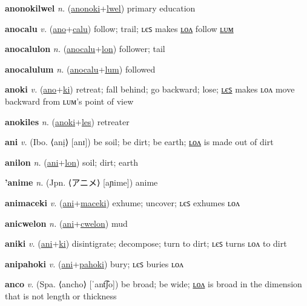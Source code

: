 \textbf{\hypertarget{anonokilwel}{anonokilwel}} \textit{n.} (\hyperlink{anonoki}{anonoki}+\allowbreak \hyperlink{lwel}{lwel})
primary education

\textbf{\hypertarget{anocalu}{anocalu}} \textit{v.} (\hyperlink{ano}{ano}+\allowbreak \hyperlink{calu}{calu})
follow; trail; ʟєꜱ makes \hyperlink{anocalulon}{ʟᴏᴧ} follow \hyperlink{anocalulum}{ʟᴜᴍ}

\textbf{\hypertarget{anocalulon}{anocalulon}} \textit{n.} (\hyperlink{anocalu}{anocalu}+\allowbreak \hyperlink{lon}{lon})
follower; tail

\textbf{\hypertarget{anocalulum}{anocalulum}} \textit{n.} (\hyperlink{anocalu}{anocalu}+\allowbreak \hyperlink{lum}{lum})
followed

\textbf{\hypertarget{anoki}{anoki}} \textit{v.} (\hyperlink{ano}{ano}+\allowbreak \hyperlink{ki}{ki})
retreat; fall behind; go backward; lose; \hyperlink{anokiles}{ʟєꜱ} makes ʟᴏᴧ move backward from ʟᴜᴍ’s point of view

\textbf{\hypertarget{anokiles}{anokiles}} \textit{n.} (\hyperlink{anoki}{anoki}+\allowbreak \hyperlink{les}{les})
retreater

\textbf{\hypertarget{ani}{ani}} \textit{v.} (Ibo. ⟨anị⟩ [anɪ])
be soil; be dirt; be earth; \hyperlink{anilon}{ʟᴏᴧ} is made out of dirt

\textbf{\hypertarget{anilon}{anilon}} \textit{n.} (\hyperlink{ani}{ani}+\allowbreak \hyperlink{lon}{lon})
soil; dirt; earth

\textbf{\hypertarget{'anime}{'anime}} \textit{n.} (Jpn. ⟨{\japanese{}アニメ}⟩ [aɲime])
anime

\textbf{\hypertarget{animaceki}{animaceki}} \textit{v.} (\hyperlink{ani}{ani}+\allowbreak \hyperlink{maceki}{maceki})
exhume; uncover; ʟєꜱ exhumes ʟᴏᴧ

\textbf{\hypertarget{anicwelon}{anicwelon}} \textit{n.} (\hyperlink{ani}{ani}+\allowbreak \hyperlink{cwelon}{cwelon})
mud

\textbf{\hypertarget{aniki}{aniki}} \textit{v.} (\hyperlink{ani}{ani}+\allowbreak \hyperlink{ki}{ki})
disintigrate; decompose; turn to dirt; ʟєꜱ turns ʟᴏᴧ to dirt

\textbf{\hypertarget{anipahoki}{anipahoki}} \textit{v.} (\hyperlink{ani}{ani}+\allowbreak \hyperlink{pahoki}{pahoki})
bury; ʟєꜱ buries ʟᴏᴧ

\textbf{\hypertarget{anco}{anco}} \textit{v.} (Spa. ⟨ancho⟩ [ˈant͡ʃo])
be broad; be wide; \hyperlink{ancolon}{ʟᴏᴧ} is broad in the dimension that is not length or thickness


